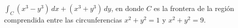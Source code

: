 \item $\int_C (x^3 - y^3) \, dx + (x^3 + y^3) \, dy$, en donde $C$ es la frontera de la región comprendida entre las circunferencias $x^2 + y^2 = 1$ y $x^2 + y^2 = 9$.

